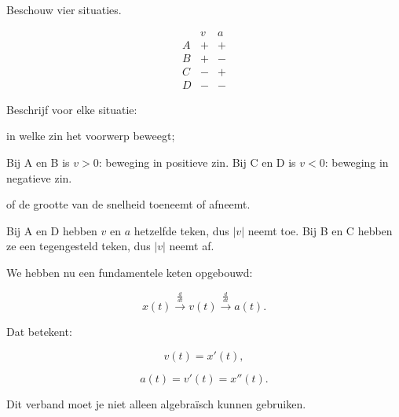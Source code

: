 \documentclass{ximera}
\begin{document}
\begin{oefening}{\oefU\ESS}

Beschouw vier situaties.

\[\begin{array}{c|cc} & v & a\\ \hline A & + & +\\ B & + & -\\ C & - & +\\ D & - & - \end{array}\]

Beschrijf voor elke situatie:

\begin{question}

in welke zin het voorwerp beweegt;

\begin{oplossing}
Bij A en B is \(v>0\): beweging in positieve zin. Bij C en D is \(v<0\): beweging in negatieve zin.
\end{oplossing}

\end{question}

\begin{question}

of de grootte van de snelheid toeneemt of afneemt.

\begin{oplossing}
Bij A en D hebben \(v\) en \(a\) hetzelfde teken, dus \(|v|\) neemt toe. Bij B en C hebben ze een tegengesteld teken, dus \(|v|\) neemt af.
\end{oplossing}

\end{question}

\end{oefening}





We hebben nu een fundamentele keten opgebouwd:

\[\boxed{ x(t) \xrightarrow{\frac{d}{dt}} v(t) \xrightarrow{\frac{d}{dt}} a(t). }\]

Dat betekent:

\[v(t)=x'(t),\]

\[a(t)=v'(t)=x''(t).\]

Dit verband moet je niet alleen algebraïsch kunnen gebruiken.
\end{document}
